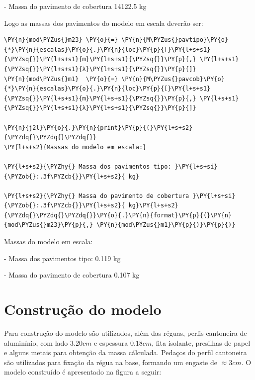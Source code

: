 - Massa do pavimento de cobertura 14122.5 kg

    
    Logo as massas dos pavimentos do modelo em escala deverão ser:

    \begin{tcolorbox}[breakable, size=fbox, boxrule=1pt, pad at break*=1mm,colback=cellbackground, colframe=cellborder]
\begin{Verbatim}[commandchars=\\\{\}]
\PY{n}{mod\PYZus{}m23} \PY{o}{=} \PY{n}{M\PYZus{}pavtipo}\PY{o}{*}\PY{n}{escalas}\PY{o}{.}\PY{n}{loc}\PY{p}{[}\PY{l+s+s1}{\PYZsq{}}\PY{l+s+s1}{m}\PY{l+s+s1}{\PYZsq{}}\PY{p}{,} \PY{l+s+s1}{\PYZsq{}}\PY{l+s+s1}{λ}\PY{l+s+s1}{\PYZsq{}}\PY{p}{]}
\PY{n}{mod\PYZus{}m1}  \PY{o}{=} \PY{n}{M\PYZus{}pavcob}\PY{o}{*}\PY{n}{escalas}\PY{o}{.}\PY{n}{loc}\PY{p}{[}\PY{l+s+s1}{\PYZsq{}}\PY{l+s+s1}{m}\PY{l+s+s1}{\PYZsq{}}\PY{p}{,} \PY{l+s+s1}{\PYZsq{}}\PY{l+s+s1}{λ}\PY{l+s+s1}{\PYZsq{}}\PY{p}{]}

\PY{n}{j2l}\PY{o}{.}\PY{n}{print}\PY{p}{(}\PY{l+s+s2}{\PYZdq{}\PYZdq{}\PYZdq{}}
\PY{l+s+s2}{Massas do modelo em escala:}

\PY{l+s+s2}{\PYZhy{} Massa dos pavimentos tipo: }\PY{l+s+si}{\PYZob{}:.3f\PYZcb{}}\PY{l+s+s2}{ kg}

\PY{l+s+s2}{\PYZhy{} Massa do pavimento de cobertura }\PY{l+s+si}{\PYZob{}:.3f\PYZcb{}}\PY{l+s+s2}{ kg}\PY{l+s+s2}{\PYZdq{}\PYZdq{}\PYZdq{}}\PY{o}{.}\PY{n}{format}\PY{p}{(}\PY{n}{mod\PYZus{}m23}\PY{p}{,} \PY{n}{mod\PYZus{}m1}\PY{p}{)}\PY{p}{)}
\end{Verbatim}
\end{tcolorbox}

    
Massas do modelo em escala:

- Massa dos pavimentos tipo: 0.119 kg

- Massa do pavimento de cobertura 0.107 kg

    
    \hypertarget{construuxe7uxe3o-do-modelo}{%
\section{Construção do modelo}\label{construuxe7uxe3o-do-modelo}}

Para construção do modelo são utilizados, além das réguas, perfis
cantoneira de aluminínio, com lado \(3.20 cm\) e espessura \(0.18 cm\),
fita isolante, presilhas de papel e alguns metais para obtenção da massa
cálculada. Pedaços do perfil cantoneira são utilizados para fixação da
régua na base, formando um engaste de \(\approx 3cm\). O modelo
construído é apresentado na figura a seguir:

